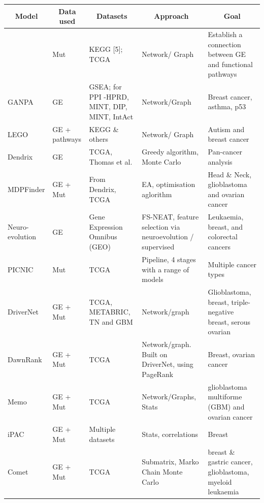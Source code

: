 \begin{appendices}
        \newpage
        \begin{small}
          \begin{longtable}[!h]{|p{2.0cm}|p{2.5cm}|p{3.5cm}|p{3.0cm}|p{5.5cm}|} 
            \hline \multicolumn{1}{|c|}{\textbf{Model}} 
            & \multicolumn{1}{c|}{\textbf{Data used}} 
            & \multicolumn{1}{c|}{\textbf{Datasets}} 
            & \multicolumn{1}{c|}{\textbf{Approach}}
            & \multicolumn{1}{c|}{\textbf{Goal}}  \\ \hline  \hline
            \endfirsthead
            
            \endlastfoot    
              \citet{Cava2018-rv} & Mut & KEGG [5]; TCGA  & Network/ Graph & Establish a connection between GE and functional pathways  \\ \hline
              GANPA & GE  & GSEA; for PPI -HPRD, MINT, DIP, MINT, IntAct & Network/Graph & Breast cancer, asthma, p53 \\ \hline
              LEGO & GE + pathways & KEGG \& others & Network/ Graph & Autism and breast cancer \\ \hline
              Dendrix & GE & TCGA, Thomas et al. & Greedy algorithm, Monte Carlo & Pan-cancer analysis \\ \hline
              MDPFinder & GE + Mut & From Dendrix, TCGA & EA, optimisation aglorithm & Head \& Neck, glioblastoma and ovarian cancer \\ \hline
              Neuro-evolution & GE & Gene Expression Omnibus (GEO) & FS-NEAT, feature selection via neuroevolution / supervised & Leukaemia, breast, and colorectal cancers \\ \hline
              PICNIC  & Mut & TCGA  & Pipeline, 4 stages with a range of models & Multiple cancer types  \\ \hline
              DriverNet & GE + Mut & TCGA, METABRIC, TN and GBM & Network/graph &  Glioblastoma, breast, triple-negative breast, serous ovarian \\ \hline
              DawnRank & GE + Mut & TCGA & Network/graph. Built on DriverNet, using PageRank & Breast, ovarian cancer \\ \hline
              Memo & GE + Mut & TCGA & Network/Graphs, Stats & glioblastoma multiforme (GBM) and ovarian cancer \\ \hline
              iPAC & GE + Mut & Multiple datasets & Stats, correlations & Breast \\ \hline
              Comet  & GE + Mut & TCGA & Submatrix, Marko Chain Monte Carlo & breast \& gastric cancer, glioblastoma, myeloid leukaemia \\ \hline

\end{longtable}
\end{small}
\end{appendices}
